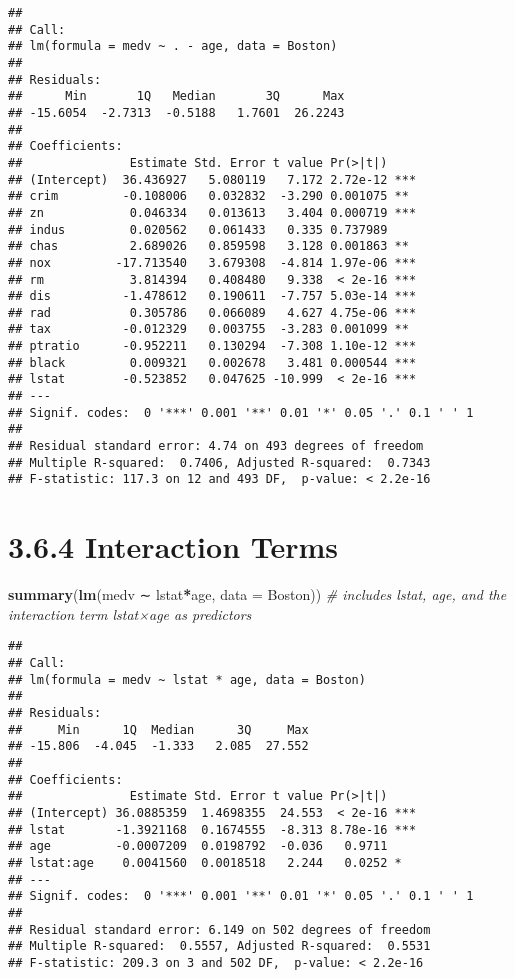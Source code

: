 \documentclass[]{article}
\newenvironment{Shaded}{\begin{snugshade}}{\end{snugshade}}
\newcommand{\CommentTok}[1]{\textcolor[rgb]{0.56,0.35,0.01}{\textit{#1}}}
\newcommand{\DataTypeTok}[1]{\textcolor[rgb]{0.13,0.29,0.53}{#1}}
\newcommand{\KeywordTok}[1]{\textcolor[rgb]{0.13,0.29,0.53}{\textbf{#1}}}
\newcommand{\NormalTok}[1]{#1}
\newcommand{\OperatorTok}[1]{\textcolor[rgb]{0.81,0.36,0.00}{\textbf{#1}}}
\begin{document}
\begin{verbatim}
## 
## Call:
## lm(formula = medv ~ . - age, data = Boston)
## 
## Residuals:
##      Min       1Q   Median       3Q      Max 
## -15.6054  -2.7313  -0.5188   1.7601  26.2243 
## 
## Coefficients:
##               Estimate Std. Error t value Pr(>|t|)    
## (Intercept)  36.436927   5.080119   7.172 2.72e-12 ***
## crim         -0.108006   0.032832  -3.290 0.001075 ** 
## zn            0.046334   0.013613   3.404 0.000719 ***
## indus         0.020562   0.061433   0.335 0.737989    
## chas          2.689026   0.859598   3.128 0.001863 ** 
## nox         -17.713540   3.679308  -4.814 1.97e-06 ***
## rm            3.814394   0.408480   9.338  < 2e-16 ***
## dis          -1.478612   0.190611  -7.757 5.03e-14 ***
## rad           0.305786   0.066089   4.627 4.75e-06 ***
## tax          -0.012329   0.003755  -3.283 0.001099 ** 
## ptratio      -0.952211   0.130294  -7.308 1.10e-12 ***
## black         0.009321   0.002678   3.481 0.000544 ***
## lstat        -0.523852   0.047625 -10.999  < 2e-16 ***
## ---
## Signif. codes:  0 '***' 0.001 '**' 0.01 '*' 0.05 '.' 0.1 ' ' 1
## 
## Residual standard error: 4.74 on 493 degrees of freedom
## Multiple R-squared:  0.7406, Adjusted R-squared:  0.7343 
## F-statistic: 117.3 on 12 and 493 DF,  p-value: < 2.2e-16
\end{verbatim}

\hypertarget{interaction-terms}{%
\section{3.6.4 Interaction Terms}\label{interaction-terms}}

\begin{Shaded}
\begin{Highlighting}[]
\KeywordTok{summary}\NormalTok{(}\KeywordTok{lm}\NormalTok{(medv ∼ lstat}\OperatorTok{*}\NormalTok{age, }\DataTypeTok{data =}\NormalTok{ Boston)) }\CommentTok{# includes lstat, age, and the interaction term lstat×age as predictors}
\end{Highlighting}
\end{Shaded}

\begin{verbatim}
## 
## Call:
## lm(formula = medv ~ lstat * age, data = Boston)
## 
## Residuals:
##     Min      1Q  Median      3Q     Max 
## -15.806  -4.045  -1.333   2.085  27.552 
## 
## Coefficients:
##               Estimate Std. Error t value Pr(>|t|)    
## (Intercept) 36.0885359  1.4698355  24.553  < 2e-16 ***
## lstat       -1.3921168  0.1674555  -8.313 8.78e-16 ***
## age         -0.0007209  0.0198792  -0.036   0.9711    
## lstat:age    0.0041560  0.0018518   2.244   0.0252 *  
## ---
## Signif. codes:  0 '***' 0.001 '**' 0.01 '*' 0.05 '.' 0.1 ' ' 1
## 
## Residual standard error: 6.149 on 502 degrees of freedom
## Multiple R-squared:  0.5557, Adjusted R-squared:  0.5531 
## F-statistic: 209.3 on 3 and 502 DF,  p-value: < 2.2e-16
\end{verbatim}
\end{document}
